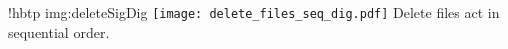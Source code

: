 \namedfigure
{!hbtp}
{img:deleteSigDig}
{\texttt{[image: delete\_files\_seq\_dig.pdf]}}
{Delete files act in sequential order.}
